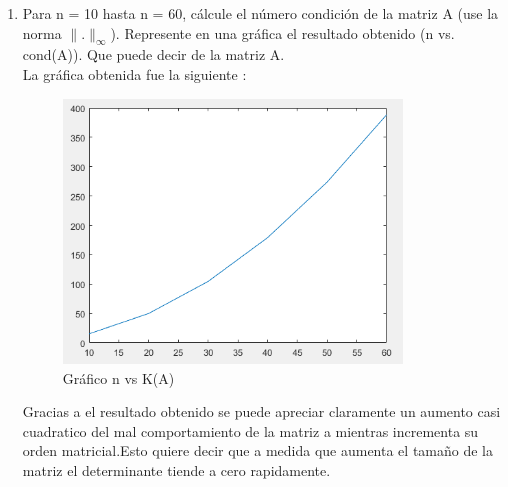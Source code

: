 \documentclass{udpreport}
\providecommand{\norm}[1]{\lVert#1\rVert}
\begin{document}
\begin{enumerate}
\begin {enumerate}
\begin{align*}
 	        \end{align*}
	        
 	        \item Para n = 10 hasta n = 60, cálcule el número condición de la matriz A (use la norma $\norm{.}_{\infty}$). Represente en una gráfica el resultado obtenido (n vs. cond(A)). Que puede decir de la matriz A.\\
 	        
 	        La gráfica obtenida fue la siguiente :
            \begin{figure}[H]
                \centering
                \includegraphics[width=9cm]{Grafico2b}
                \caption{Gráfico n vs K(A)} \label{fig:Grafico2b}
            \end{figure}
            
            Gracias a el resultado obtenido se puede apreciar claramente un aumento casi cuadratico del mal comportamiento de la matriz a mientras incrementa su orden matricial.Esto quiere decir que a medida que aumenta el tamaño de la matriz el determinante tiende a cero rapidamente.
            
 	        
 	 \end{enumerate}
 \end{enumerate}


\newpage
\end{document}

